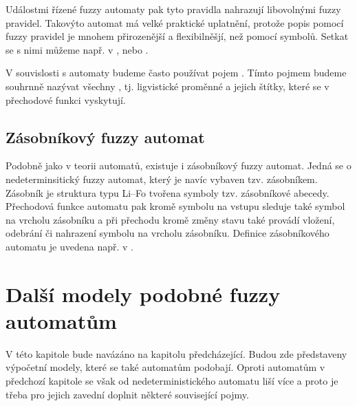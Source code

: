 \documentclass[a4paper,10pt]{article}
\begin{document}
Událostmi řízené fuzzy automaty pak tyto pravidla nahrazují libovolnými fuzzy \ifthen pravidel. Takovýto automat má velké praktické uplatnění, protože popis pomocí fuzzy \ifthen pravidel je mnohem přirozenější a flexibilněšjí, než pomocí symbolů. Setkat se s nimi můžeme např. v \cite{TriHei-ExpDesSeqFuzPer}, \cite{AlvJoaCru-FuStMaAppEmoModEleGamCha} nebo \cite{TzaRig-StaAnaAdaFuzzConSysUsiPetrNetLeaAut}.

\begin{note}
 V souvislosti s automaty budeme často používat pojem . Tímto pojmem budeme souhrnně nazývat všechny , tj. ligvistické proměnné a jejich štítky, které se v přechodové funkci vyskytují.
\end{note}

\subsection{Zásobníkový fuzzy automat}
Podobně jako v  teorii automatů, existuje i zásobníkový fuzzy automat. Jedná se o nedeterminsitický fuzzy automat, který je navíc vybaven tzv. zásobníkem. Zásobník je struktura typu Li--Fo tvořena symboly tzv. zásobníkové abecedy. Přechodová funkce automatu pak kromě symbolu na vstupu sleduje také symbol na vrcholu zásobníku a při přechodu kromě změny stavu také provádí vložení, odebrání či nahrazení symbolu na vrcholu zásobníku. Definice zásobníkového automatu je uvedena např. v \cite{BucPas-FuzPusAut}.

\section{Další modely podobné fuzzy automatům}
V této kapitole bude navázáno na kapitolu předcházející. Budou zde představeny výpočetní modely, které se také automatům podobají. Oproti automatům v předchozí kapitole se však od  nedeterministického automatu liší více a proto je třeba pro jejich zavední doplnit některé související pojmy. 


\end{document}
